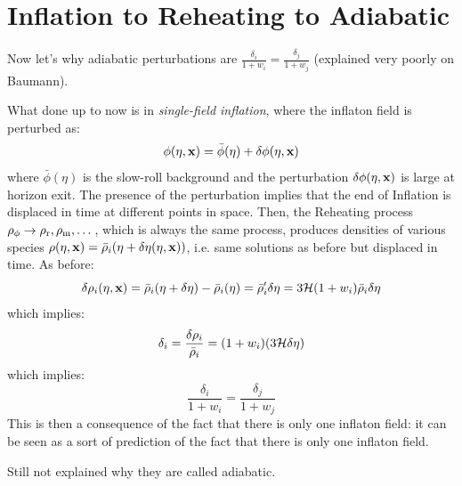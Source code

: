 \section{Inflation to Reheating to Adiabatic}

Now let's why adiabatic perturbations are $ \frac{\delta_i}{1 + w_i} = \frac{\delta_j}{1 + w_j} $ (explained very poorly on Baumann).

What done up to now is in \emph{single-field inflation}, where the inflaton field is perturbed as:
\begin{equation*}
  \phi(\eta , \mathbf{x}) = \bar{\phi}(\eta) + \delta \phi(\eta , \mathbf{x})
\end{equation*}
where $ \bar{\phi}(\eta) $ is the slow-roll background and the perturbation $ \delta \phi(\eta , \mathbf{x}) $ is large at horizon exit. The presence of the perturbation implies that the end of Inflation is displaced in time at different points in space. Then, the Reheating process $ \rho_\phi \rightarrow \rho_\text{r} , \rho_\text{m} , \dots $, which is always the same process, produces densities of various species $ \rho(\eta , \mathbf{x}) = \bar{\rho}_i (\eta + \delta \eta (\eta , \mathbf{x})) $, i.e. same solutions as before but displaced in time. As before:
\begin{equation*}
  \delta \rho_i(\eta , \mathbf{x}) = \bar{\rho}_i (\eta + \delta \eta) - \bar{\rho}_i(\eta) = \bar{\rho}_i' \delta \eta = 3 \mathcal{H} (1 + w_i) \bar{\rho}_i \delta \eta
\end{equation*}
which implies:
\begin{equation*}
  \delta_i = \frac{\delta \rho_i}{\bar{\rho}_i} = (1 + w_i) (3 \mathcal{H} \delta \eta)
\end{equation*}
which implies:
\begin{equation*}
  \frac{\delta_i}{1 + w_i} = \frac{\delta_j}{1 + w_j}
\end{equation*}
This is then a consequence of the fact that there is only one inflaton field: it can be seen as a sort of prediction of the fact that there is only one inflaton field.

Still not explained why they are called adiabatic.

